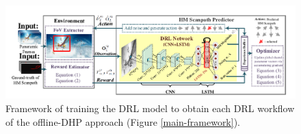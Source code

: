 \documentclass[10pt,journal,compsoc]{IEEEtran}
\begin{document}
\begin{figure}
	\begin{center}
		\centerline{\includegraphics[width=1.5\columnwidth]{figures/dhp_approach/training_framework_2}}%
		\caption{\footnotesize{Framework of training the DRL model to obtain each DRL workflow of the offline-DHP approach (Figure \ref{main-framework}).}}
		\label{train-framework}
	\end{center}
\end{figure}
\end{document}
